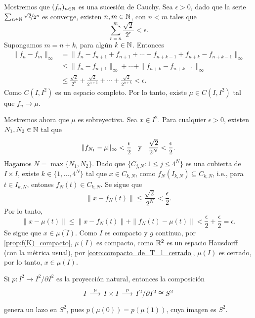 Mostremos que $(f_n)_{n\in\mathbb{N}}$ es una sucesión de Cauchy. Sea $\epsilon>0$, dado que la serie $\sum_{n\in \mathbb{N}}\nicefrac{\sqrt{2}}{2^n}$ es converge, existen $n,m\in\mathbb{N}$, con $n<m$ tales que 
$$\sum_{r=n}^m\frac{\sqrt{2}}{2^r}<\epsilon.$$
Supongamos $m=n+k$, para algún $k\in\mathbb{N}$. Entonces
\begin{align*}
    \|f_n-f_m\|_\infty&=\|f_n-f_{n+1}+f_{n+1}+\cdots+f_{n+k-1}+f_{n+k}-f_{n+k-1}\|_{\infty}\\
    &\leq \|f_n-f_{n+1}\|_\infty+\cdots+\|f_{n+k}-f_{n+k-1}\|_\infty\\
    &\leq \frac{\sqrt{2}}{2^n}+\frac{\sqrt{2}}{2^{n+1}}+\cdots+ \frac{\sqrt{2}}{2^{n+k}}
    < \epsilon.
\end{align*}
Como ${C}(I,I^2)$ es un espacio completo. Por lo tanto, existe $\mu\in {C}(I,I^2)$ tal que $f_n\to \mu$.

Mostremos ahora que $\mu$ es sobreyectiva. Sea $x\in I^2$. Para cualquier $\epsilon>0$, existen $N_1,N_2\in\mathbb{N}$ tal que 
$$
\|f_{N_1}-\mu\|_\infty<\frac{\epsilon}{2}\text{ \; y \; }
\frac{\sqrt{2}}{2^N}<\frac{\epsilon}{2}.
$$  
Hagamos $N=\max\{N_1,N_2\}$. Dado que $\{C_{j,N}:1\leq j\leq 4^N\}$ es una cubierta de $I\times I$, existe $k\in \{1,\ldots, 4^N\}$ tal que $x\in C_{k,N}$, como $f_N(I_{k,N})\subseteq C_{k,N}$, i.e., para $t\in I_{k,N}$, entones $f_N(t)\in C_{k,N}$. Se sigue que
\begin{equation*}
    \|x-f_N(t)\|\leq \frac{\sqrt{2}}{2^N}<\frac{\epsilon}{2}.
\end{equation*}
Por lo tanto, 
\begin{equation*}
    \|x-\mu(t)\|\leq\|x-f_N(t)\|+\|f_N(t)-\mu(t)\|<\frac{\epsilon}{2}+\frac{\epsilon}{2}=\epsilon.
\end{equation*}
Se sigue que $x\in \overline{\mu(I)}$. Como $I$ es compacto y $g$ continua, por \ref{prop:f(K)_compacto}, $\mu(I)$ es compacto, como $\mathbb{R}^2$ es un espacio Hausdorff (con la métrica usual), por \ref{coro:compacto_de_T_1_cerrado}, $\mu(I)$ es cerrado, por lo tanto, $x\in \mu(I)$. 

Si $p:I^2\to I^2/\partial I^2$ es la proyección natural, entonces la composición
\begin{equation*}
\begin{tikzcd}[column sep=0.55cm]
        I\arrow[r,"\mu"] & I\times I\arrow[r,"p"] & I^2/\partial I^2\cong S^2
\end{tikzcd}
\end{equation*}
genera un lazo en $S^2$, pues $p(\mu(0))=p(\mu(1))$, cuya imagen es $S^2$.

